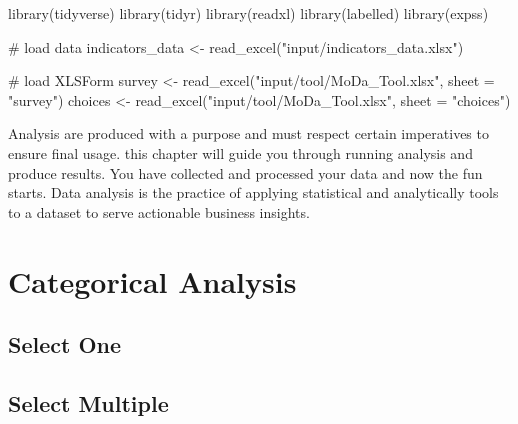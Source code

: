 \documentclass[
  letterpaper,
  DIV=11,
  numbers=noendperiod]{scrreprt}
\newenvironment{Shaded}{\begin{snugshade}}{\end{snugshade}}
\newcommand{\AttributeTok}[1]{\textcolor[rgb]{0.40,0.45,0.13}{#1}}
\newcommand{\CommentTok}[1]{\textcolor[rgb]{0.37,0.37,0.37}{#1}}
\newcommand{\FunctionTok}[1]{\textcolor[rgb]{0.28,0.35,0.67}{#1}}
\newcommand{\NormalTok}[1]{\textcolor[rgb]{0.00,0.23,0.31}{#1}}
\newcommand{\OtherTok}[1]{\textcolor[rgb]{0.00,0.23,0.31}{#1}}
\newcommand{\StringTok}[1]{\textcolor[rgb]{0.13,0.47,0.30}{#1}}
\begin{document}
\begin{Shaded}
\begin{Highlighting}[]
\FunctionTok{library}\NormalTok{(tidyverse)}
\FunctionTok{library}\NormalTok{(tidyr)}
\FunctionTok{library}\NormalTok{(readxl)}
\FunctionTok{library}\NormalTok{(labelled)}
\FunctionTok{library}\NormalTok{(expss)}

\CommentTok{\# load data}
\NormalTok{indicators\_data }\OtherTok{\textless{}{-}} \FunctionTok{read\_excel}\NormalTok{(}\StringTok{"input/indicators\_data.xlsx"}\NormalTok{)}

\CommentTok{\# load XLSForm}
\NormalTok{survey }\OtherTok{\textless{}{-}} \FunctionTok{read\_excel}\NormalTok{(}\StringTok{"input/tool/MoDa\_Tool.xlsx"}\NormalTok{, }\AttributeTok{sheet =} \StringTok{"survey"}\NormalTok{)}
\NormalTok{choices }\OtherTok{\textless{}{-}} \FunctionTok{read\_excel}\NormalTok{(}\StringTok{"input/tool/MoDa\_Tool.xlsx"}\NormalTok{, }\AttributeTok{sheet =} \StringTok{"choices"}\NormalTok{)}
\end{Highlighting}
\end{Shaded}

Analysis are produced with a purpose and must respect certain
imperatives to ensure final usage. this chapter will guide you through
running analysis and produce results. You have collected and processed
your data and now the fun starts. Data analysis is the practice of
applying statistical and analytically tools to a dataset to serve
actionable business insights.

\section{Categorical Analysis}\label{categorical-analysis}

\subsection{Select One}\label{select-one}

\subsection{Select Multiple}\label{select-multiple}
\end{document}
